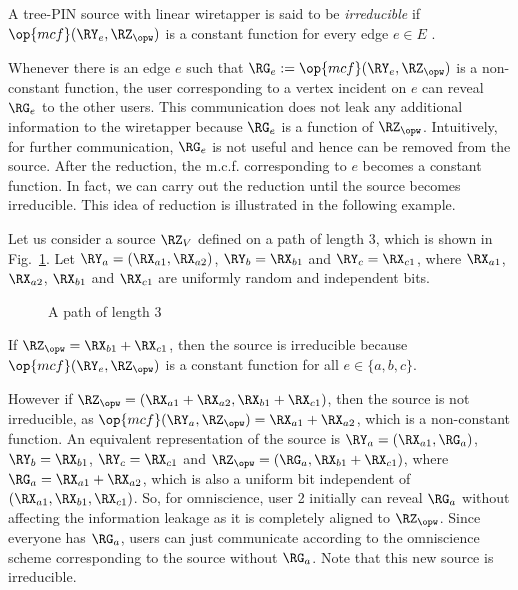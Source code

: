 \begin{definition} \label{def:irreducible}
 A tree-PIN source with linear wiretapper is said to be \emph{irreducible} if $\op{mcf}(\RY_e, \RZ_{\opw}) $ is a constant function for every edge $e \in E$ .
\end{definition}

Whenever there is an edge $e$ such that $\RG_e:=\op{mcf}(\RY_e, \RZ_{\opw}) $ is a non-constant function, the user corresponding to a vertex incident on $e$ can reveal $\RG_e$ to the other users. This communication does not leak any additional information to the wiretapper because $\RG_e$ is a function of $\RZ_{\opw}$. Intuitively, for further communication, $\RG_e$ is not useful and hence can be removed from the source. After the reduction, the m.c.f. corresponding to $e$ becomes a constant function. In fact, we can carry out the reduction until the source becomes irreducible. This idea of reduction is illustrated in the following example.

\begin{Example}
Let us consider a source $\RZ_V$ defined on a path of length 3, which is shown in Fig.~\ref{fig:exampletree}. Let $\RY_a = (\RX_{a1}, \RX_{a2})$, $\RY_b = \RX_{b1}$ and $\RY_c =\RX_{c1}$, where $\RX_{a1}$, $\RX_{a2}$, $\RX_{b1}$ and $\RX_{c1}$ are uniformly random and independent bits. 
\begin{figure}[h]
\centering
\resizebox{\width}{1cm}{}
\caption{A path of length 3}
\label{fig:exampletree}
 \end{figure}
 If $\RZ_{\opw}=\RX_{b1}+\RX_{c1}$, then the source is irreducible because $\op{mcf}(\RY_e, \RZ_{\opw})$ is a constant function for all $e \in \{a,b,c\}$. 
 
 However if  $\RZ_{\opw}=(\RX_{a1}+\RX_{a2},  \RX_{b1}+\RX_{c1})$, then the source is not irreducible, as $\op{mcf}(\RY_a, \RZ_{\opw}) =\RX_{a1}+\RX_{a2}$, which is a non-constant function. An equivalent representation of the source is
 $\RY_a = (\RX_{a1}, \RG_{a})$, $\RY_b = \RX_{b1}$, $\RY_c =\RX_{c1}$ and $\RZ_{\opw}=(\RG_{a}, \RX_{b1}+\RX_{c1})$, where $\RG_{a}=\RX_{a1}+\RX_{a2}$, which is also a uniform bit independent of $(\RX_{a1}, \RX_{b1}, \RX_{c1})$. So, for omniscience, user 2 initially can reveal $\RG_{a}$ without affecting the information leakage as it is completely aligned to $\RZ_{\opw}$. Since everyone has $\RG_a$, users can just communicate according to the omniscience scheme corresponding to the source without $\RG_a$. Note that this new source is irreducible.
\end{Example}

